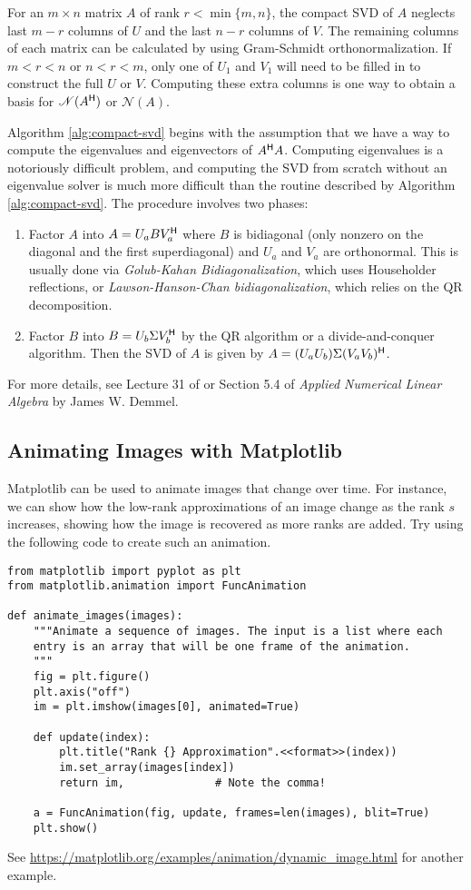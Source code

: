 For an $m\times n$ matrix $A$ of rank $r < \min\{m,n\}$, the compact SVD of $A$ neglects last $m-r$ columns of $U$ and the last $n-r$ columns of $V$.
The remaining columns of each matrix can be calculated by using Gram-Schmidt orthonormalization.
If $m < r < n$ or $n < r < m$, only one of $U_1$ and $V_1$ will need to be filled in to construct the full $U$ or $V$.
Computing these extra columns is one way to obtain a basis for $\mathscr{N}(A^{\mathsf H})$ or $\mathscr{N}(A)$.

Algorithm \ref{alg:compact-svd} begins with the assumption that we have a way to compute the eigenvalues and eigenvectors of $A^{\mathsf H} A$.
Computing eigenvalues is a notoriously difficult problem, and computing the SVD from scratch without an eigenvalue solver is much more difficult than the routine described by Algorithm \ref{alg:compact-svd}.
The procedure involves two phases:
\begin{enumerate}
    \item Factor $A$ into $A = U_a B V^{\mathsf H}_a$ where $B$ is bidiagonal (only nonzero on the diagonal and the first superdiagonal) and $U_a$ and $V_a$ are orthonormal.
    This is usually done via \emph{Golub-Kahan Bidiagonalization}, which uses Householder reflections, or \emph{Lawson-Hanson-Chan bidiagonalization}, which relies on the QR decomposition.
    \item Factor $B$ into $B = U_b \Sigma V^{\mathsf H}_b$ by the QR algorithm or a divide-and-conquer algorithm.
    Then the SVD of $A$ is given by $A = (U_aU_b)\Sigma (V_aV_b)^{\mathsf H}$.
\end{enumerate}
For more details, see Lecture 31 of \cite{Trefethen1997} or Section 5.4 of \emph{Applied Numerical Linear Algebra} by James W. Demmel.

\subsection*{Animating Images with Matplotlib} %

Matplotlib can be used to animate images that change over time.
For instance, we can show how the low-rank approximations of an image change as the rank $s$ increases, showing how the image is recovered as more ranks are added.
Try using the following code to create such an animation.

\begin{lstlisting}
from matplotlib import pyplot as plt
from matplotlib.animation import FuncAnimation

def animate_images(images):
    """Animate a sequence of images. The input is a list where each
    entry is an array that will be one frame of the animation.
    """
    fig = plt.figure()
    plt.axis("off")
    im = plt.imshow(images[0], animated=True)

    def update(index):
        plt.title("Rank {} Approximation".<<format>>(index))
        im.set_array(images[index])
        return im,              # Note the comma!

    a = FuncAnimation(fig, update, frames=len(images), blit=True)
    plt.show()
\end{lstlisting}
See \url{https://matplotlib.org/examples/animation/dynamic_image.html} for another example.
